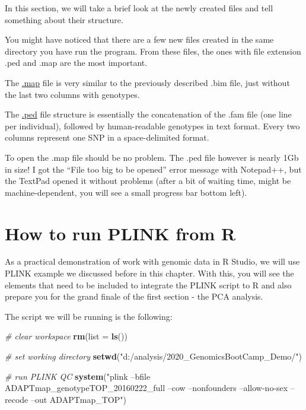 \documentclass[]{book}
\newenvironment{Shaded}{\begin{snugshade}}{\end{snugshade}}
\newcommand{\KeywordTok}[1]{\textcolor[rgb]{0.13,0.29,0.53}{\textbf{#1}}}
\newcommand{\DataTypeTok}[1]{\textcolor[rgb]{0.13,0.29,0.53}{#1}}
\newcommand{\StringTok}[1]{\textcolor[rgb]{0.31,0.60,0.02}{#1}}
\newcommand{\CommentTok}[1]{\textcolor[rgb]{0.56,0.35,0.01}{\textit{#1}}}
\newcommand{\NormalTok}[1]{#1}
\begin{document}
In this section, we will take a brief look at the newly created files
and tell something about their structure.

You might have noticed that there are a few new files created in the
same directory you have run the program. From these files, the ones with
file extension .ped and .map are the most important.

The \href{https://www.cog-genomics.org/plink/1.9/formats\#map}{.map}
file is very similar to the previously described .bim file, just without
the last two columns with genotypes.

The \href{https://www.cog-genomics.org/plink/1.9/formats\#ped}{.ped}
file structure is essentially the concatenation of the .fam file (one
line per individual), followed by human-readable genotypes in text
format. Every two columns represent one SNP in a space-delimited format.

To open the .map file should be no problem. The .ped file however is
nearly 1Gb in size! I got the ``File too big to be opened'' error
message with Notepad++, but the TextPad opened it without problems
(after a bit of waiting time, might be machine-dependent, you will see a
small progress bar bottom left).

\section{How to run PLINK from R}\label{how-to-run-plink-from-r}

As a practical demonstration of work with genomic data in R Studio, we
will use PLINK example we discussed before in this chapter. With this,
you will see the elements that need to be included to integrate the
PLINK script to R and also prepare you for the grand finale of the first
section - the PCA analysis.

The script we will be running is the following:

\begin{Shaded}
\begin{Highlighting}[]
\CommentTok{# clear workspace}
\KeywordTok{rm}\NormalTok{(}\DataTypeTok{list =} \KeywordTok{ls}\NormalTok{())}

\CommentTok{# set working directory}
\KeywordTok{setwd}\NormalTok{(}\StringTok{"d:/analysis/2020_GenomicsBootCamp_Demo/"}\NormalTok{)}

\CommentTok{# run PLINK QC}
\KeywordTok{system}\NormalTok{(}\StringTok{"plink --bfile ADAPTmap_genotypeTOP_20160222_full --cow --nonfounders             --allow-no-sex --recode --out ADAPTmap_TOP"}\NormalTok{)}
\end{Highlighting}
\end{Shaded}
\end{document}
